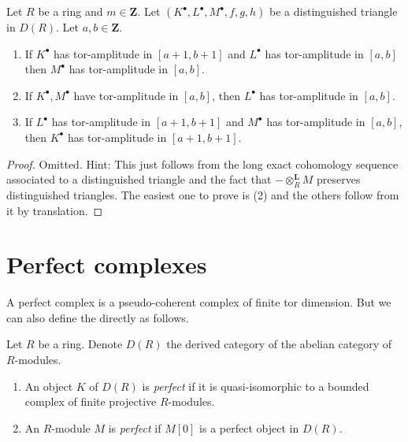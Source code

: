 \begin{lemma}
\label{lemma-cone-tor-amplitude}
Let $R$ be a ring and $m \in \mathbf{Z}$.
Let $(K^\bullet, L^\bullet, M^\bullet, f, g, h)$ be a distinguished
triangle in $D(R)$. Let $a, b \in \mathbf{Z}$.
\begin{enumerate}
\item If $K^\bullet$ has tor-amplitude in $[a + 1, b + 1]$ and
$L^\bullet$ has tor-amplitude in $[a, b]$ then $M^\bullet$ has
tor-amplitude in $[a, b]$.
\item If $K^\bullet, M^\bullet$ have tor-amplitude in $[a, b]$, then
$L^\bullet$ has tor-amplitude in $[a, b]$.
\item If $L^\bullet$ has tor-amplitude in $[a + 1, b + 1]$
and $M^\bullet$ has tor-amplitude in $[a, b]$, then
$K^\bullet$ has tor-amplitude in $[a + 1, b + 1]$.
\end{enumerate}
\end{lemma}

\begin{proof}
Omitted. Hint: This just follows from the long exact cohomology sequence
associated to a distinguished triangle and the fact that
$- \otimes_R^{\mathbf{L}} M$ preserves distinguished triangles.
The easiest one to prove is (2) and the others follow from it by
translation.
\end{proof}












\section{Perfect complexes}
\label{section-perfect}

\noindent
A perfect complex is a pseudo-coherent complex of finite tor dimension.
But we can also define the directly as follows.

\begin{definition}
\label{definition-perfect}
Let $R$ be a ring. Denote $D(R)$ the derived category of the abelian
category of $R$-modules.
\begin{enumerate}
\item An object $K$ of $D(R)$ is {\it perfect} if it is quasi-isomorphic
to a bounded complex of finite projective $R$-modules.
\item An $R$-module $M$ is {\it perfect} if $M[0]$ is a perfect object
in $D(R)$.
\end{enumerate}
\end{definition}

